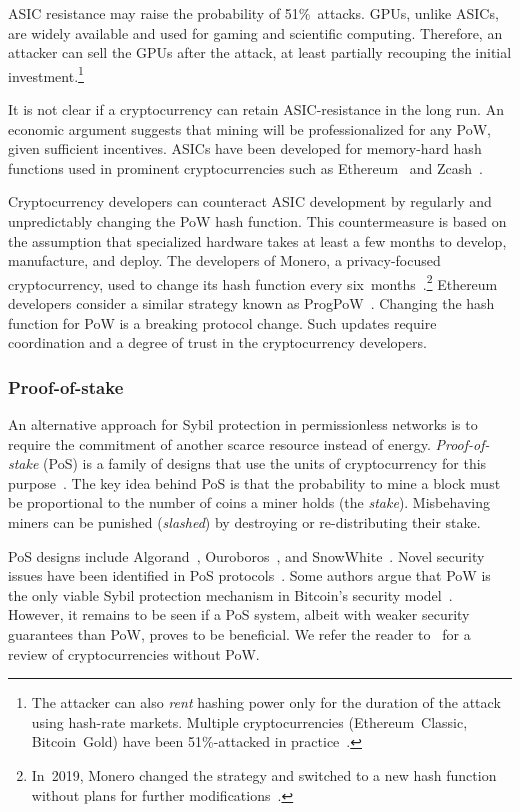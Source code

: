 ASIC resistance may raise the probability of 51\%~attacks.
GPUs, unlike ASICs, are widely available and used for gaming and scientific computing.
Therefore, an attacker can sell the GPUs after the attack, at least partially recouping the initial investment.\footnote{The attacker can also \textit{rent} hashing power only for the duration of the attack using hash-rate markets. Multiple cryptocurrencies (Ethereum~Classic, Bitcoin~Gold) have been 51\%-attacked in practice~\cite{Xazax3102019}.}

It is not clear if a cryptocurrency can retain ASIC-resistance in the long run.
An economic argument suggests that mining will be professionalized for any PoW, given sufficient incentives.
ASICs have been developed for memory-hard hash functions used in prominent cryptocurrencies such as Ethereum~\cite{OLeary2018} and Zcash~\cite{Floyd2018}.

Cryptocurrency developers can counteract ASIC development by regularly and unpredictably changing the PoW hash function.
This countermeasure is based on the assumption that specialized hardware takes at least a few months to develop, manufacture, and deploy.
The developers of Monero, a privacy-focused cryptocurrency, used to change its hash function every six~months~\cite{Kim2019}.\footnote{In~2019, Monero changed the strategy and switched to a new hash function without plans for further modifications~\cite{dEBRUYNE2019}.}
Ethereum developers consider a similar strategy known as ProgPoW~\cite{OLeary2019}.
Changing the hash function for PoW is a breaking protocol change.
Such updates require coordination and a degree of trust in the cryptocurrency developers.


\subsubsection*{Proof-of-stake}

An alternative approach for Sybil protection in permissionless networks is to require the commitment of another scarce resource instead of energy.
\textit{Proof-of-stake} (PoS) is a family of designs that use the units of cryptocurrency for this purpose~\cite{Bano2019}.
The key idea behind PoS is that the probability to mine a block must be proportional to the number of coins a miner holds (the \textit{stake}).
Misbehaving miners can be punished (\textit{slashed}) by destroying or re-distributing their stake.


PoS designs include Algorand~\cite{Chen2019}, Ouroboros~\cite{Kiayias2017}, and SnowWhite~\cite{Bentov2016a}.
Novel security issues have been identified in PoS protocols~\cite{Fanti2019,Gazi2018,BrownCohen2019,Chitra2020}.
Some authors argue that PoW is the only viable Sybil protection mechanism in Bitcoin's security model~\cite{Andreev2014, Sztorc2015, Poelstra2015}.
However, it remains to be seen if a PoS system, albeit with weaker security guarantees than PoW, proves to be beneficial.
We refer the reader to~\cite{Bentov2016} for a review of cryptocurrencies without PoW.


